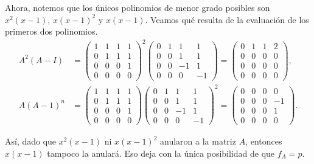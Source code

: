 \begin{example}
    Ahora, notemos que los únicos polinomios de menor grado posibles son $x^2(x-1)$, $x(x-1)^2$ y $x(x-1)$. Veamos qué resulta de la evaluación de los primeros dos polinomios.
    \begin{align*}
      A^2(A-I) &= \begin{pmatrix}
        1 & 1 & 1 & 1 \\
        0 & 1 & 1 & 1 \\
        0 & 0 & 0 & 1 \\
        0 & 0 & 0 & 0
      \end{pmatrix}^2 \begin{pmatrix}
        0 & 1 & 1 & 1 \\
        0 & 0 & 1 & 1 \\
        0 & 0 & -1 & 1 \\
        0 & 0 & 0 & -1
      \end{pmatrix}  
      = \begin{pmatrix}
        0 & 1 & 1 & 2 \\
         0 & 0 & 0 &0  \\ 
         0 & 0 & 0 & 0 \\ 
         0 & 0 & 0 & 0
       \end{pmatrix}, \\
       A(A-1)^n &=
       \begin{pmatrix}
        1 & 1 & 1 & 1 \\
        0 & 1 & 1 & 1 \\
        0 & 0 & 0 & 1 \\
        0 & 0 & 0 & 0
      \end{pmatrix} \begin{pmatrix}
        0 & 1 & 1 & 1 \\
        0 & 0 & 1 & 1 \\
        0 & 0 & -1 & 1 \\
        0 & 0 & 0 & -1
      \end{pmatrix}^2
      = \begin{pmatrix} 0 & 0 & 0 & 0 \\ 0 & 0 & 0 & -1 \\ 0 & 0 & 0 & 1 \\ 0 & 0 & 0 & 0 \end{pmatrix}.
    \end{align*}
  
  Así, dado que $x^2(x-1)$ ni $x(x-1)^2$ anularon a la matriz $A$, entonces $x(x-1)$ tampoco la anulará. Eso deja con la única posibilidad de que $f_A = p$.
\end{example}